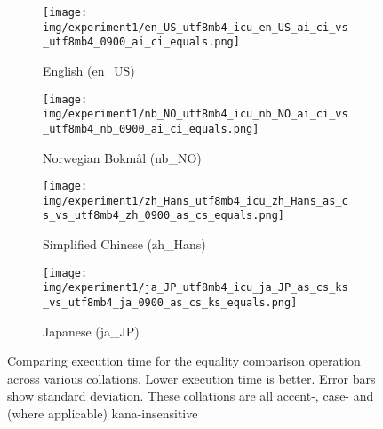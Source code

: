 
    \begin{figure}[htp]
    \centering
    \begin{subfigure}{.45\textwidth}
                \centering
                \texttt{[image: img/experiment1/en\_US\_utf8mb4\_icu\_en\_US\_ai\_ci\_vs\_utf8mb4\_0900\_ai\_ci\_equals.png]}
                \label{fig:experiment1_equals_en_US_utf8mb4_icu_en_US_ai_ci_vs_utf8mb4_0900_ai_ci_equals}
                \caption{English (en\_US)}
            \end{subfigure}
    \hfill
    \begin{subfigure}{.45\textwidth}
                \centering
                \texttt{[image: img/experiment1/nb\_NO\_utf8mb4\_icu\_nb\_NO\_ai\_ci\_vs\_utf8mb4\_nb\_0900\_ai\_ci\_equals.png]}
                \label{fig:experiment1_equals_nb_NO_utf8mb4_icu_nb_NO_ai_ci_vs_utf8mb4_nb_0900_ai_ci_equals}
                \caption{Norwegian Bokmål (nb\_NO)}
            \end{subfigure}
    \par
    \begin{subfigure}{.45\textwidth}
                \centering
                \texttt{[image: img/experiment1/zh\_Hans\_utf8mb4\_icu\_zh\_Hans\_as\_cs\_vs\_utf8mb4\_zh\_0900\_as\_cs\_equals.png]}
                \label{fig:experiment1_equals_zh_Hans_utf8mb4_icu_zh_Hans_as_cs_vs_utf8mb4_zh_0900_as_cs_equals}
                \caption{Simplified Chinese (zh\_Hans)}
            \end{subfigure}
    \hfill
    \begin{subfigure}{.45\textwidth}
                \centering
                \texttt{[image: img/experiment1/ja\_JP\_utf8mb4\_icu\_ja\_JP\_as\_cs\_ks\_vs\_utf8mb4\_ja\_0900\_as\_cs\_ks\_equals.png]}
                \label{fig:experiment1_equals_ja_JP_utf8mb4_icu_ja_JP_as_cs_ks_vs_utf8mb4_ja_0900_as_cs_ks_equals}
                \caption{Japanese (ja\_JP)}
            \end{subfigure}
    \caption{Comparing execution time for the equality comparison operation across various collations. Lower execution time is better. Error bars show standard deviation. These collations are all accent-, case- and (where applicable) kana-insensitive}
    \label{fig:experiment1_equals}
    \end{figure}
    
